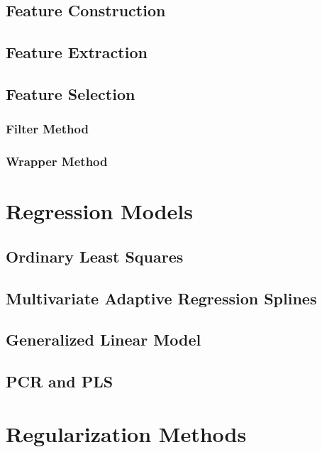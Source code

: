 \documentclass[12pt,]{krantz}
\theoremstyle{definition}
\theoremstyle{definition}
\theoremstyle{definition}
\theoremstyle{remark}
\begin{document}
\section{Feature Construction}\label{feature-construction}

\section{Feature Extraction}\label{feature-extraction}

\section{Feature Selection}\label{feature-selection}

\subsection{Filter Method}\label{filter-method}

\subsection{Wrapper Method}\label{wrapper-method}

\chapter{Regression Models}\label{regression-models}

\section{Ordinary Least Squares}\label{ordinary-least-squares}

\section{Multivariate Adaptive Regression
Splines}\label{multivariate-adaptive-regression-splines}

\section{Generalized Linear Model}\label{generalized-linear-model}

\section{PCR and PLS}\label{pcr-and-pls}

\chapter{Regularization Methods}\label{regularization-methods}
\end{document}
